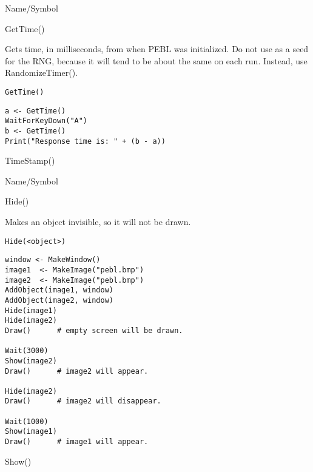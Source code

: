 \rl



\begin{desc}{Name/Symbol}
\item[Name/Symbol]	GetTime()

\item[Description]	Gets time, in milliseconds, from when PEBL was initialized. 
	Do not use as a seed for the RNG, because it will tend to be 
	about the same on each run. Instead, use RandomizeTimer().

\item[Usage]
\begin{verbatim}
GetTime()
\end{verbatim}

\item[Example]
\begin{verbatim}
a <- GetTime()
WaitForKeyDown("A")
b <- GetTime()
Print("Response time is: " + (b - a))
\end{verbatim}

\item[See Also]	TimeStamp()
\end{desc}

\rl




\begin{desc}{Name/Symbol}
\item[Name/Symbol]	Hide() 

\item[Description]	Makes an object invisible, so it will not be drawn.

\item[Usage]
\begin{verbatim}
Hide(<object>)
\end{verbatim}

\item[Example]
\begin{verbatim}
window <- MakeWindow()
image1  <- MakeImage("pebl.bmp")
image2  <- MakeImage("pebl.bmp")
AddObject(image1, window)
AddObject(image2, window)
Hide(image1)
Hide(image2)
Draw()		# empty screen will be drawn.
	
Wait(3000)
Show(image2)
Draw()		# image2 will appear.

Hide(image2)
Draw()		# image2 will disappear.

Wait(1000)
Show(image1)
Draw()		# image1 will appear.
\end{verbatim}
 
\item[See Also]	Show()
\end{desc}

